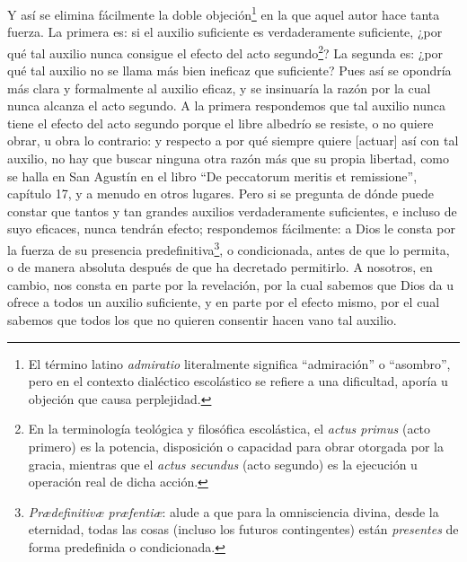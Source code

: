 \documentclass{article}
\begin{document}
Y así se elimina fácilmente la doble objeción\footnote{El término latino
\textit{admiratio} literalmente significa \enquote{admiración} o \enquote{asombro}, pero
en el contexto dialéctico escolástico se refiere a una dificultad, aporía u objeción que
causa perplejidad.} en la que aquel autor hace tanta fuerza. La primera es: si el
auxilio suficiente es verdaderamente suficiente, ¿por qué tal auxilio nunca consigue el
efecto del acto segundo\footnote{En la terminología teológica y filosófica escolástica,
el \textit{actus primus} (acto primero) es la potencia, disposición o capacidad para
obrar otorgada por la gracia, mientras que el \textit{actus secundus} (acto segundo) es
la ejecución u operación real de dicha acción.}? La segunda es: ¿por qué tal auxilio no
se llama más bien ineficaz que suficiente? Pues así se opondría más clara y formalmente
al auxilio eficaz, y se insinuaría la razón por la cual nunca alcanza el acto segundo. A
la primera respondemos que tal auxilio nunca tiene el efecto del acto segundo porque el
libre albedrío se resiste, o no quiere obrar, u obra lo contrario: y respecto a por qué
siempre quiere [actuar] así con tal auxilio, no hay que buscar ninguna otra razón más
que su propia libertad, como se halla en San Agustín en el libro \enquote{De peccatorum
meritis et remissione}, capítulo 17, y a menudo en otros lugares. Pero si se pregunta de
dónde puede constar que tantos y tan grandes auxilios verdaderamente suficientes, e
incluso de suyo eficaces, nunca tendrán efecto; respondemos fácilmente: a Dios le consta
por la fuerza de su presencia predefinitiva\footnote{\textit{Prædefinitivæ præfentiæ}:
alude a que para la omnisciencia divina, desde la eternidad, todas las cosas (incluso
los futuros contingentes) están \textit{presentes} de forma predefinida o
condicionada.}, o condicionada, antes de que lo permita, o de manera absoluta después de
que ha decretado permitirlo. A nosotros, en cambio, nos consta en parte por la
revelación, por la cual sabemos que Dios da u ofrece a todos un auxilio suficiente, y en
parte por el efecto mismo, por el cual sabemos que todos los que no quieren consentir
hacen vano tal auxilio.
\end{document}
